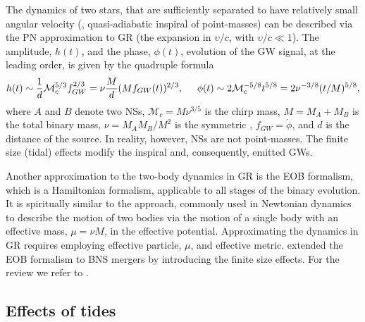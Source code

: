 The dynamics of two stars, that are sufficiently separated to have relatively small 
angular velocity (\ie, quasi-adiabatic inspiral of point-masses) 
can be described via the \ac{PN} approximation to \ac{GR} 
(the expansion in $\upsilon/c$, with $\upsilon/c\ll 1$).
%
The amplitude, $h(t)$, and the phase, $\phi(t)$, evolution of the \ac{GW} signal, at the leading order, 
is given by the quadruple formula \citep{Radice:2020ddv} 
%
\begin{equation}
\label{eq:intro:gw_wave}
h(t) \sim \frac{1}{d}\mathcal{M}_c^{5/3} f_{GW}^{2/3} = \nu\frac{M}{d}(Mf_{GW}(t))^{2/3}, \hspace{5mm} 
\phi(t) \sim 2\mathcal{M}_c^{-5/8}t^{5/8} = 2\nu^{-3/8}(t/M)^{5/8},
\end{equation}
%
where $A$ and $B$ denote two \acp{NS}, $\mathcal{M}_c = M\nu^{3/5}$ is the chirp mass, $M = M_A + M_B$ is the total binary mass, 
$\nu = M_A M_B/M^2$ is the symmetric \mr{}, $f_{GW} = \dot{\phi}$, and $d$ is the distance of the source.
%
In reality, however, \acp{NS} are not point-masses. 
The finite size (tidal) effects modify the 
inspiral and, consequently, emitted \acp{GW}. 
%

Another approximation to the two-body dynamics in \ac{GR} is the \ac{EOB} formalism,
which is a Hamiltonian formalism, applicable to all stages of the binary evolution.
It is spiritually similar to the approach, commonly used in Newtonian dynamics to 
describe the motion of two bodies via the motion of a single body with an effective mass, 
$\mu=\nu M$, in the effective potential. Approximating the dynamics in \ac{GR} requires 
employing effective particle, $\mu$, and effective metric. 
%
\citet{Damour:2009wj} extended the \ac{EOB} formalism to \ac{BNS} mergers by 
introducing the finite size effects. For the review we refer to \citet{Damour:2012mv}.


\subsection{Effects of tides}


